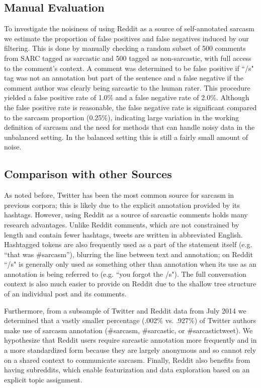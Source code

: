 \documentclass[10pt, a4paper]{article}
\begin{document}
\subsection{Manual Evaluation}
\label{subsec:manual}

To investigate the noisiness of using Reddit as a source of self-annotated sarcasm we estimate the proportion of false positives and false negatives induced by our filtering.
This is done by manually checking a random subset of 500 comments from SARC tagged as sarcastic and 500 tagged as non-sarcastic, with full access to the comment's context.
A comment was determined to be false positive if ``/s" tag was not an annotation but part of the sentence and a false negative if the comment author was clearly being sarcastic to the human rater.
This procedure yielded a false positive rate of 1.0\% and a false negative rate of 2.0\%.
Although the false positive rate is reasonable, the false negative rate is significant compared to the sarcasm proportion (0.25\%), indicating large variation in the working definition of sarcasm and the need for methods that can handle noisy data in the unbalanced setting.
In the balanced setting this is still a fairly small amount of noise.  

\subsection{Comparison with other Sources}
\label{subsec:twitter}

As noted before, Twitter has been the most common source for sarcasm in previous corpora;
this is likely due to the explicit annotation provided by its hashtags.
However, using Reddit as a source of sarcastic comments holds many research advantages.
Unlike Reddit comments, which are not constrained by length and contain fewer hashtags, tweets are written in abbreviated English.
Hashtagged tokens are also frequently used as a part of the statement itself (e.g. ``that was \#sarcasm''), blurring the line between text and annotation; on Reddit ``/s" is generally only used as something other than annotation when its use as an annotation is being referred to (e.g. ``you forgot the /s").
The full conversation context is also much easier to provide on Reddit due to the shallow tree structure of an individual post and its comments.

Furthermore, from a subsample of Twitter and Reddit data from July 2014 we determined that a vastly smaller percentage (.002\% vs. .927\%) of Twitter authors make use of sarcasm annotation (\#sarcasm, \#sarcastic, or \#sarcastictweet).
We hypothesize that Reddit users require sarcastic annotation more frequently and in a more standardized form because they are largely anonymous and so cannot rely on a shared context to communicate sarcasm.
Finally, Reddit also benefits from having subreddits, which enable featurization and data exploration based on an explicit topic assignment.
\end{document}
